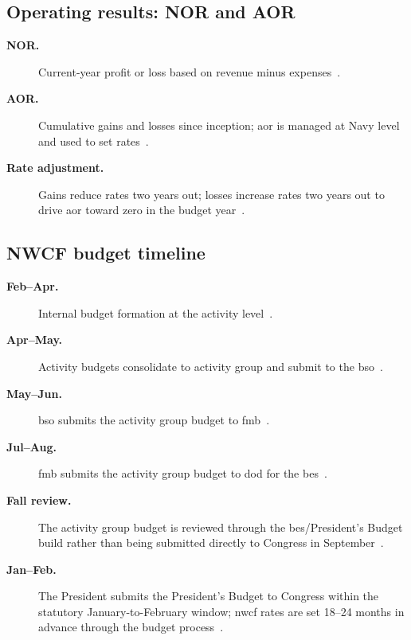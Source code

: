 \documentclass[../main.tex]{subfiles}
\begin{document}
\subsection{Operating results: NOR and AOR}
\begin{description}
  \item[\textbf{NOR.}] Current-year profit or loss based on revenue minus expenses~\autocite{edo-3-1-5-field-activity-fm-2025,DoDFMR-Vol11B-Ch3}.
  \item[\textbf{AOR.}] Cumulative gains and losses since inception; \ac{aor} is managed at Navy level and used to set rates~\autocite{edo-3-1-5-field-activity-fm-2025,DoDFMR-Vol11B-Ch3}.
  \item[\textbf{Rate adjustment.}] Gains reduce rates two years out; losses increase rates two years out to drive \ac{aor} toward zero in the budget year~\autocite{edo-3-1-5-field-activity-fm-2025,DoDFMR-Vol11B-Ch3}.
\end{description}

\subsection{NWCF budget timeline}
\begin{description}
  \item[\textbf{Feb--Apr.}] Internal budget formation at the activity level~\autocite{edo-3-1-5-field-activity-fm-2025}.
  \item[\textbf{Apr--May.}] Activity budgets consolidate to activity group and submit to the \ac{bso}~\autocite{edo-3-1-5-field-activity-fm-2025}.
  \item[\textbf{May--Jun.}] \ac{bso} submits the activity group budget to \ac{fmb}~\autocite{edo-3-1-5-field-activity-fm-2025}.
  \item[\textbf{Jul--Aug.}] \ac{fmb} submits the activity group budget to \ac{dod} for the \ac{bes}~\autocite{edo-3-1-5-field-activity-fm-2025}.
  \item[\textbf{Fall review.}] The activity group budget is reviewed through the \ac{bes}/President's Budget build rather than being submitted directly to Congress in September~\autocite{edo-3-1-5-field-activity-fm-2025,OMB-A11}.
  \item[\textbf{Jan--Feb.}] The President submits the President's Budget to Congress within the statutory January-to-February window; \ac{nwcf} rates are set 18--24 months in advance through the budget process~\autocite{USC-1105-Federal-Budget,OMB-A11,edo-3-1-5-field-activity-fm-2025,DoDFMR-Vol11B-Ch3}.
\end{description}
\end{document}
